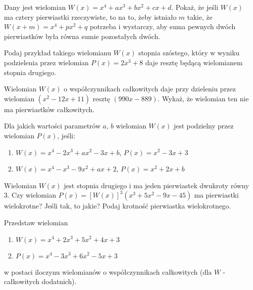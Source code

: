 \documentclass{article}
\begin{document}
\begin{zadanie}
  Dany jest wielomian $W(x)=x^4+ax^3+bx^2+cx+d$. Pokaż, że jeśli $W(x)$ ma cztery pierwiastki rzeczywiste, to na to, żeby istniało $m$ takie, że $W(x+m)=x^4+px^2+q$ potrzeba i wystarczy, aby suma pewnych dwóch pierwiastków była równa sumie pozostałych dwóch. 
\end{zadanie}


\begin{zadanie}
  Podaj przykład takiego wielomianu $W(x)$ stopnia szóstego, który w wyniku podzielenia przez wielomian $P(x)=2x^3+8$ daje resztę będącą wielomianem stopnia drugiego.
\end{zadanie}

\begin{zadanie}
  Wielomian $W(x)$ o współczynnikach całkowitych daje przy dzieleniu przez wielomian $(x^2-12x+11)$ resztę $(990x-889)$. Wykaż, że wielomian ten nie ma pierwiastków całkowitych.
\end{zadanie}

\begin{zadanie}
  Dla jakich wartości parametrów $a$, $b$ wielomian $W(x)$ jest podzielny przez wielomian $P(x)$, jeśli:
  \begin{enumerate}
    \item $W(x)=x^4-2x^3+ax^2-3x+b$, $P(x)=x^2-3x+3$
    \item $W(x)=x^4-x^3-9x^2+ax+2$, $P(x)=x^2+2x+b$
  \end{enumerate}
\end{zadanie}

\begin{zadanie}
  Wielomian $W(x)$ jest stopnia drugiego i ma jeden pierwiastek dwukroty równy $3$. Czy wielomian $P(x)=[W(x)]^3(x^3+5x^2-9x-45)$ ma pierwiastki wielokrotne? Jeśli tak, to jakie? Podaj krotność pierwiastka wielokrotnego.
\end{zadanie}

\begin{zadanie}
  Przedstaw wielomian 
  \begin{enumerate}
    \item $W(x)=x^4+2x^3+5x^2+4x+3$ 
    \item $P(x)=x^4-3x^3+6x^2-5x+3$
  \end{enumerate}
  w postaci iloczynu wielomianów o współczynnikach całkowitych (dla $W$ - całkowitych dodatnich). 
\end{zadanie}
\end{document}
